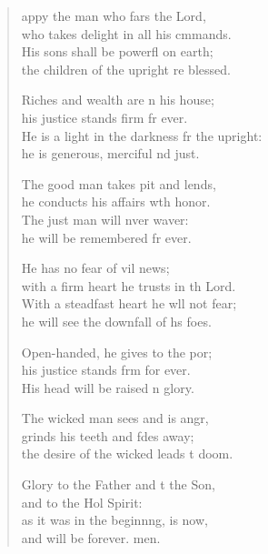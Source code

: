 \settowidth{\versewidth}{He is a light in the darkness for the upright: *}
\begin{verse}%
  \begin{patverse}
appy the man who fars the Lord,\Med\\
who takes delight in all his cmmands.\\
His sons shall be powerfl on earth;\Med\\
the children of the upright re blessed.

Riches and wealth are \pointup{\i}n his house;\Med\\
his justice stands firm fr ever.\\
He is a light in the darkness fr the upright:\Med\\
he is generous, merciful nd just.

The good man takes pit and lends,\Med\\
he conducts his affairs w\pointup{\i}th honor.\\
The just man will nver waver:\Med\\
he will be remembered fr ever.

He has no fear of vil news;\Med\\
with a firm heart he trusts in th Lord.\\
With a steadfast heart he w\pointup{\i}ll not fear;\Med\\
he will see the downfall of h\pointup{\i}s foes.

Open-handed, he gives to the por;\Flex\\
his justice stands f\pointup{\i}rm for ever.\Med\\
His head will be raised \pointup{\i}n glory.

The wicked man sees and is angr,\Flex\\
grinds his teeth and fdes away;\Med\\
the desire of the wicked leads t doom.

Glory to the Father and t the Son,\Med\\
and to the Hol Spirit:\\
as it was in the beginn\pointup{\i}ng, is now,\Med\\
and will be forever. men. 
  \end{patverse}
\end{verse}

